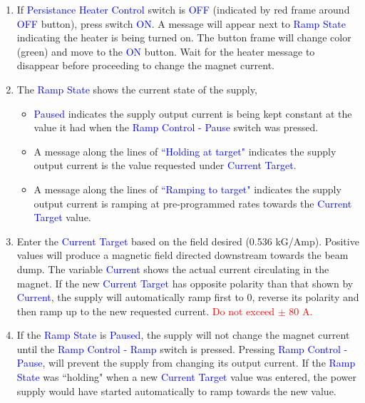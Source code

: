 {\vspace{-\parskip}
\begin{enumerate}
\item If \textcolor{blue}{Persistance Heater Control} switch is \textcolor{blue}{OFF} (indicated by red frame around \textcolor{blue}{OFF} button), press switch \textcolor{blue}{ON}. A message will appear next to \textcolor{blue}{Ramp State} indicating the heater is being turned on. The button frame will change color (green) and move to the \textcolor{blue}{ON} button. Wait for the heater message to disappear before proceeding to change the magnet current.
\item The \textcolor{blue}{Ramp State} shows the current state of the supply,
\vspace{-\parskip}
\begin{itemize}
\item \textcolor{blue}{Paused} indicates the supply output current is being kept constant at the value it had when the \textcolor{blue}{Ramp Control - Pause} switch was pressed.
\item A message along the lines of \textcolor{blue}{``Holding at target"} indicates the supply output current is the value requested under \textcolor{blue}{Current Target}.
\item A message along the lines of \textcolor{blue}{``Ramping to target"} indicates the supply output current is ramping at pre-programmed rates towards the \textcolor{blue}{Current Target} value.
\end{itemize}
\item Enter the \textcolor{blue}{Current Target} based on the field desired (0.536 kG/Amp). Positive values will produce a magnetic field directed downstream towards the beam dump. The variable \textcolor{blue}{Current} shows the actual current circulating in the magnet. If the new \textcolor{blue}{Current Target} has opposite polarity than that shown by \textcolor{blue}{Current}, the supply will automatically ramp first to 0, reverse its polarity and then ramp up to the new requested current. \textcolor{red}{Do not exceed $\pm$ 80 A.}
\item If the \textcolor{blue}{Ramp State} is \textcolor{blue}{Paused}, the supply will not change the magnet current until the \textcolor{blue}{Ramp Control - Ramp} switch is pressed. Pressing \textcolor{blue}{Ramp Control - Pause}, will prevent the supply from changing its output current. If the \textcolor{blue}{Ramp State} was ``holding" when a new \textcolor{blue}{Current Target} value was entered, the power supply would have started automatically to ramp towards the new value.

\end{enumerate}}
